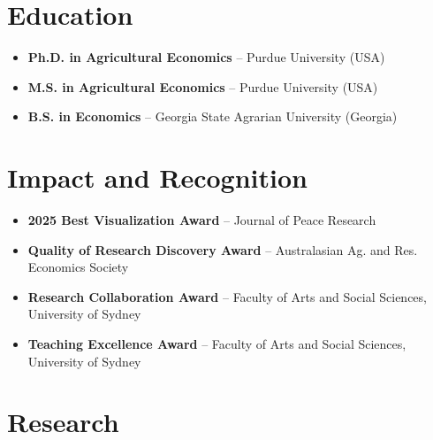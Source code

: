 \documentclass[10pt]{article}
\begin{document}
	\section*{Education}
	\begin{itemize}
		\item {} \textbf{Ph.D. in Agricultural Economics} -- Purdue University (USA)
		\item {} \textbf{M.S. in Agricultural Economics} -- Purdue University (USA)
		\item {} \textbf{B.S. in Economics} -- Georgia State Agrarian University (Georgia)
	\end{itemize}
	
	\section*{Impact and Recognition}
	\begin{itemize}
		\item {} \textbf{2025 Best Visualization Award} -- Journal of Peace Research
		\item {} \textbf{Quality of Research Discovery Award} -- Australasian Ag. and Res. Economics Society
		\item {} \textbf{Research Collaboration Award} -- Faculty of Arts and Social Sciences, University of Sydney
		\item {} \textbf{Teaching Excellence Award} -- Faculty of Arts and Social Sciences, University of Sydney
	\end{itemize}
	
	
	\section*{Research}
	
	\begin{refsection}
		\nocite{ubilava2026,hastings2025,ubilava2023ajae,ferguson2022,ubilava2022agec,hastings2022,angus2021,atalay2021,ubilava2019el,ubilava2019erl,ubilava2019md,ubilava2018ajae,smith2017gec,ubilava2017wd,tack2015agec,ubilava2014erae,tack2013cc,ubilava2013ems,ubilava2013ajare,ubilava2012agec,ubilava2012agri,ubilava2011jare,ubilava2011jcb,ubilava2010tfsc,ubilava2009fp}
		\printbibliography[heading={article}]
	\end{refsection}
	
	\begin{refsection}
		\nocite{meat_resilience,prices_protests,missions_misaligned,aid_interrupted}
		\printbibliography[heading={progress}]
	\end{refsection}
	
\end{document}
